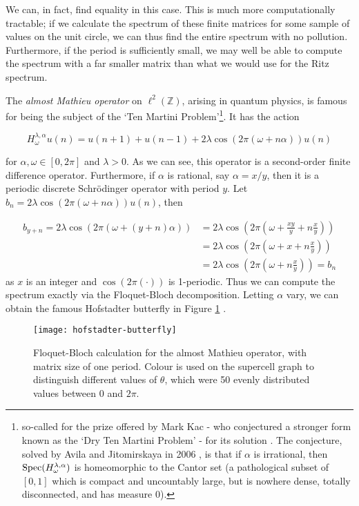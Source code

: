 \documentclass[../main.tex]{subfiles}
\begin{document}
We can, in fact, find equality in this case.
This is much more computationally tractable; if we calculate the spectrum of these finite matrices for some sample of values on the unit circle, we can thus find the entire spectrum with no pollution. Furthermore, if the period is sufficiently small, we may well be able to compute the spectrum with a far smaller matrix than what we would use for the Ritz spectrum.

\begin{example}
The \emph{almost Mathieu operator} on $\ell^2(\mathbb{Z})$, arising in quantum physics, is famous for being the subject of the `Ten Martini Problem'\footnote{so-called for the prize offered by Mark Kac - who conjectured a stronger form known as the `Dry Ten Martini Problem' - for its solution \cite{simon1982almost}. The conjecture, solved by Avila and Jitomirskaya in 2006 \cite{avila2006ten}, is that if $\alpha$ is irrational, then $\mathrm{Spec}(H_\omega^{\lambda, \alpha})$ is homeomorphic to the Cantor set (a pathological subset of $[0, 1]$ which is compact and uncountably large, but is nowhere dense, totally disconnected, and has measure 0).}. It has the action

$$H_\omega^{\lambda, \alpha} u(n) = u(n+1) + u(n-1) + 2\lambda \cos(2\pi (\omega + n \alpha))u(n)$$

for $\alpha, \omega \in [0, 2\pi]$ and $\lambda > 0$. As we can see, this operator is a second-order finite difference operator. Furthermore, if $\alpha$ is rational, say $\alpha = x/y$, then it is a periodic discrete Schr\"odinger operator with period $y$. Let $b_n = 2\lambda \cos(2\pi (\omega + n \alpha))u(n)$, then

\begin{align*}
b_{y+n} = 2\lambda \cos(2\pi (\omega + (y + n) \alpha)) & = 2\lambda \cos(2\pi (\omega +  \frac{xy}{y} + n \frac{x}{y})) \\
& = 2\lambda \cos(2\pi (\omega + x + n \frac{x}{y})) \\
& = 2\lambda \cos(2\pi (\omega + n \frac{x}{y})) = b_n
\end{align*}
as $x$ is an integer and $\cos(2\pi(\cdot))$ is 1-periodic. Thus we can compute the spectrum exactly via the Floquet-Bloch decomposition. Letting $\alpha$ vary, we can obtain the famous Hofstadter butterfly in Figure \ref{fig:hofstadter-butterfly} \cite{hofstadter1976energy}.

\begin{figure}[p!]
\centering

\texttt{[image: hofstadter-butterfly]}

\caption{Floquet-Bloch calculation for the almost Mathieu operator, with matrix size of one period. Colour is used on the supercell graph to distinguish different values of $\theta$, which were 50 evenly distributed values between $0$ and $2 \pi$.}\label{fig:hofstadter-butterfly}
\end{figure}
\clearpage
\end{example}
\end{document}
